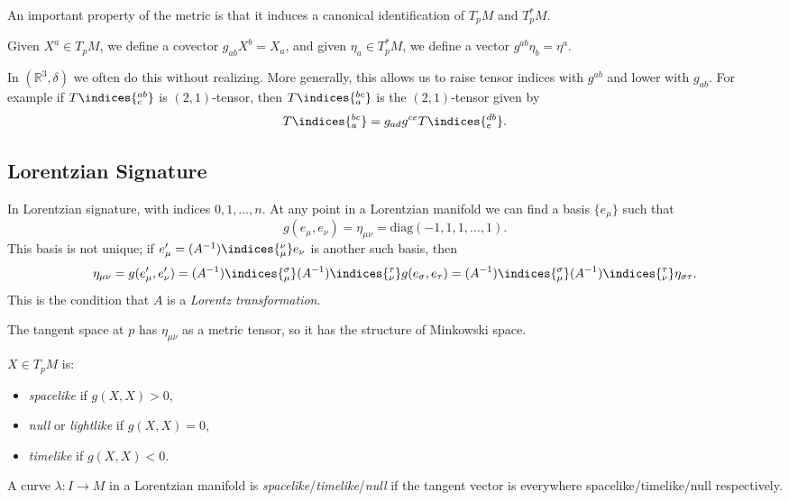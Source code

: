 \documentclass[12pt]{article}
\begin{document}
An important property of the metric is that it induces a canonical identification of $T_pM$ and $T^\ast_pM$.

Given $X^a \in T_pM$, we define a covector $g_{ab} X^b = X_a$, and given $\eta_a \in T_p^\ast M$, we define a vector $g^{ab}\eta_b = \eta^a$.

In $(\mathbb{R}^3, \delta)$ we often do this without realizing. More generally, this allows us to raise tensor indices with $g^{ab}$ and lower with $g_{ab}$. For example if $T\indices{^{ab}_{c}}$ is  $(2, 1)$-tensor, then $T\indices{_{a}^{bc}}$ is the $(2, 1)$-tensor given by
\[
T\indices{_{a}^{bc}} = g_{ad} g^{ce} T\indices{^{db}_{e}}.
\]

\subsection{Lorentzian Signature}%
\label{sub:lorsig}

In Lorentzian signature, with indices $0, 1, \ldots, n$. At any point in a Lorentzian manifold we can find a basis $\{e_\mu\}$ such that
\[
g(e_\mu, e_\nu) = \eta_{\mu\nu} = \mathrm{diag}(-1, 1, 1, \ldots, 1).
\]
This basis is not unique; if $e_\mu' = (A^{-1})\indices{^{\nu}_{\mu}} e_\nu$ is another such basis, then
\[
\eta_{\mu\nu} = g(e_\mu', e_\nu') = (A^{-1})\indices{^{\sigma}_{\mu}} (A^{-1})\indices{^{\tau}_{\nu}} g(e_\sigma, e_\tau) = (A^{-1})\indices{^{\sigma}_{\mu}} (A^{-1})\indices{^{\tau}_{\nu}} \eta_{\sigma\tau}.
\]
This is the condition that $A$ is a \emph{Lorentz transformation}.

The tangent space at $p$ has $\eta_{\mu\nu}$ as a metric tensor, so it has the structure of Minkowski space.

\begin{definition}
	$X \in T_p M$ is:
	\begin{itemize}
		\item \emph{spacelike} if $g(X, X) > 0$,
		\item \emph{null} or \emph{lightlike} if $g(X, X) = 0$,
		\item \emph{timelike} if $g(X, X) < 0$.
	\end{itemize}
\end{definition}

A curve $\lambda : I \to M$ in a Lorentzian manifold is \emph{spacelike}/\emph{timelike}/\emph{null} if the tangent vector is everywhere spacelike/timelike/null respectively.
\end{document}
